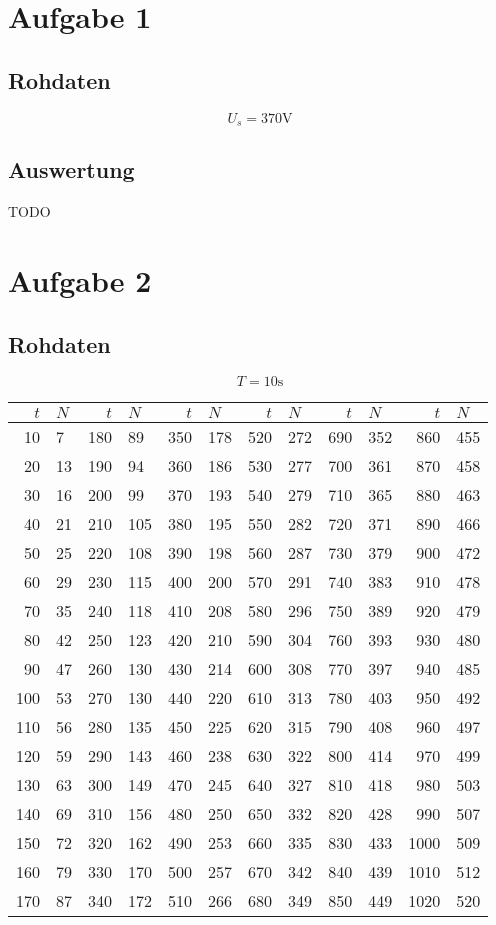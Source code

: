 \documentclass[12pt,a4paper]{article}
\begin{document}
\section*{Aufgabe 1}
\subsection*{Rohdaten}
\[ U_s = 370 \mbox{V} \]

\subsection*{Auswertung}
TODO


\section*{Aufgabe 2}
\subsection*{Rohdaten}
\[ T = 10 \mbox{s} \]
\begin{tabular}{|r|l|r|l|r|l|r|l|r|l|r|l|}
\hline
$t$&$N$&$t$&$N$&$t$&$N$&$t$&$N$&$t$&$N$&$t$&$N$\\
\hline
10&7&180&89&350&178&520&272&690&352&860&455\\
20&13&190&94&360&186&530&277&700&361&870&458\\
30&16&200&99&370&193&540&279&710&365&880&463\\
40&21&210&105&380&195&550&282&720&371&890&466\\
50&25&220&108&390&198&560&287&730&379&900&472\\
60&29&230&115&400&200&570&291&740&383&910&478\\
70&35&240&118&410&208&580&296&750&389&920&479\\
80&42&250&123&420&210&590&304&760&393&930&480\\
90&47&260&130&430&214&600&308&770&397&940&485\\
100&53&270&130&440&220&610&313&780&403&950&492\\
110&56&280&135&450&225&620&315&790&408&960&497\\
120&59&290&143&460&238&630&322&800&414&970&499\\
130&63&300&149&470&245&640&327&810&418&980&503\\
140&69&310&156&480&250&650&332&820&428&990&507\\
150&72&320&162&490&253&660&335&830&433&1000&509\\
160&79&330&170&500&257&670&342&840&439&1010&512\\
170&87&340&172&510&266&680&349&850&449&1020&520\\
\hline
\end{tabular}
\end{document}
